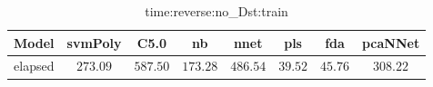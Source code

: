 \begin{table}[!ht]
	\centering
	\begin{tabular}{|c|c|c|c|c|c|c|c|}
		\hline
		Model & svmPoly & C5.0 & nb & nnet & pls & fda & pcaNNet \\ \hline
		elapsed & $273.09$ & $587.50$ & $173.28$ & $486.54$ & $39.52$ & $45.76$ & $308.22$ \\ \hline
	\end{tabular}
	\caption{time:reverse:no_Dst:train}
	\label{tab:time:reverse:no_Dst:train}
\end{table}
